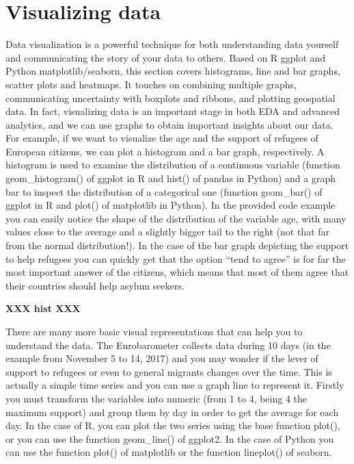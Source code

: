 \section{Visualizing data}

Data visualization is a powerful technique for both understanding data yourself and communicating the story of your data to others. Based on R ggplot and Python matplotlib/seaborn, this section covers histograms, line and bar graphs, scatter plots and heatmaps. It touches on combining multiple graphs, communicating uncertainty with boxplots and ribbons, and plotting geospatial data.  In fact, visualizing data is an important stage in both EDA and advanced analytics, and we can use graphs to obtain important insights about our data. For example, if we want to visualize the age and the support of refugees of European citizens, we can plot a histogram and a bar graph, respectively. A histogram is used to examine the distribution of a continuous variable (function geom\_histogram() of ggplot in R and hist() of pandas in Python) and a graph bar to inspect the distribution of a categorical one (function geom\_bar() of ggplot in R and plot() of matplotlib in Python). In the provided code example you can easily notice the shape of the distribution of the variable age, with many values close to the average and a slightly bigger tail to the right (not that far from the normal distribution!).  In the case of the bar graph depicting the support to help refugees you can quickly get that the option “tend to agree” is for far the most important answer of the citizens, which means that most of them agree that their countries should help asylum seekers.

\textbf{XXX  hist  XXX}

There are many more basic visual representations that can help you to understand the data. The Eurobarometer collects data during 10 days (in the example from November 5 to 14, 2017) and you may wonder if the lever of support to refugees or even to general migrants changes over the time. This is actually a simple time series and you can use a graph line to represent it. Firstly you must transform the variables into numeric (from 1 to 4, being 4 the maximum support) and group them by day in order to get the average for each day. In the case of R, you can plot the two series using the base function plot(), or you can use the function geom\_line() of ggplot2. In the case of Python you can use the function plot() of matplotlib or the function lineplot() of seaborn.	

